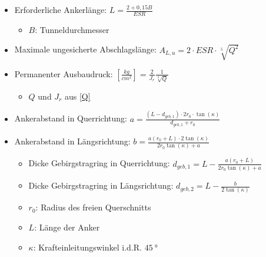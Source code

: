 \documentclass[fleqn,twoside]{article}
\begin{document}
\begin{itemize}
\begin{table}[H]
\begin{tabular}{|c p{13.3cm}|c|}
        \end{tabular}
    \end{table}
    \item Erforderliche Ankerlänge: $L=\frac{2+0,15B}{ESR}$
    \begin{itemize}
        \item $B$: Tunneldurchmesser
    \end{itemize}
    \item Maximale ungesicherte Abschlagslänge: $A_{L,u}=2\cdot ESR \cdot \sqrt[5]{Q^2}$
    \item Permanenter Ausbaudruck: $ \left[ \frac{kg}{cm^2} \right] =\frac{2}{J_r}\frac{1}{\sqrt[3]{Q}}$
    \begin{itemize}
        \item $Q$ und $J_r$ aus \autoref{Q}
    \end{itemize}
    \item Ankerabstand in Querrichtung: $a=\frac{(L-d_{geb,1})\cdot2r_0\cdot \tan(\kappa)}{d_{geb,1}+r_0}$
    \item Ankerabstand in Längsrichtung: $b=\frac{a(r_0+L)\cdot2\tan(\kappa)}{2r_0\tan(\kappa)+a}$
    \begin{itemize}
        \item Dicke Gebirgstragring in Querrichtung: $d_{geb,1}=L-\frac{a(r_0+L)}{2r_0\tan(\kappa)+a}$
        \item Dicke Gebirgstragring in Längsrichtung: $d_{geb,2}=L-\frac b{2\tan(\kappa)}$
        \item $r_0$: Radius des freien Querschnitts
        \item $L$: Länge der Anker
        \item $\kappa$: Krafteinleitungswinkel i.d.R. $\SI{45}{\degree}$
    \end{itemize}
\end{itemize}
\end{document}
